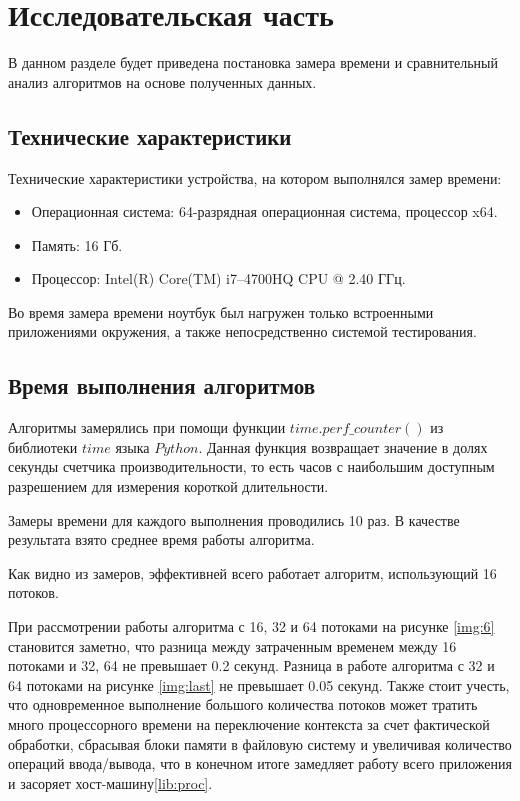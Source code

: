 \chapter{Исследовательская часть}

В данном разделе будет приведена постановка замера времени и сравнительный анализ алгоритмов на основе полученных данных.

\section{Технические характеристики}

Технические характеристики устройства, на котором выполнялся замер времени:

\begin{itemize}
	\item Операционная система: 64-разрядная операционная система, процессор x64.
	\item Память: 16 Гб.
	\item Процессор: Intel(R) Core(TM) i7--4700HQ CPU @ 2.40 ГГц.
\end{itemize}

Во время замера времени ноутбук был нагружен только встроенными приложениями окружения, а также непосредственно системой тестирования.

\section{Время выполнения алгоритмов}

Алгоритмы замерялись при помощи функции $time.perf\_counter()$ из библиотеки $time$ языка $Python$. Данная функция возвращает значение в долях секунды счетчика производительности, то есть часов с наибольшим доступным разрешением для измерения короткой длительности.

Замеры времени для каждого выполнения проводились 10 раз. В качестве результата взято среднее время работы алгоритма.


Как видно из замеров, эффективней всего работает алгоритм, использующий 16 потоков.


При рассмотрении работы алгоритма с 16, 32 и 64 потоками на рисунке \ref{img:6} становится заметно, что разница между затраченным временем между 16 потоками и 32, 64 не превышает 
0.2 секунд. Разница в работе алгоритма с 32 и 64 потоками на рисунке \ref{img:last} не превышает 0.05 секунд. Также стоит учесть, что одновременное выполнение большого количества потоков может тратить много процессорного времени на переключение контекста за счет фактической обработки, сбрасывая блоки памяти в файловую систему и увеличивая количество операций ввода/вывода, что в конечном итоге замедляет работу всего приложения и засоряет хост-машину\ref{lib:proc}.



